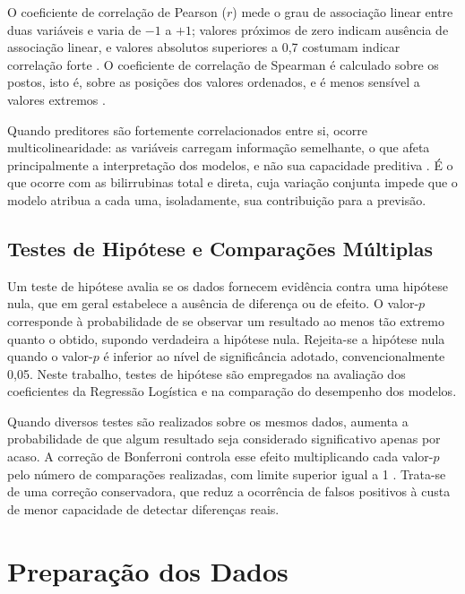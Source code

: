 O coeficiente de correlação de Pearson ($r$) mede o grau de associação linear entre duas variáveis e varia de $-1$ a $+1$; valores próximos de zero indicam ausência de associação linear, e valores absolutos superiores a 0,7 costumam indicar correlação forte \cite{Dormann2013Collinearity}. O coeficiente de correlação de Spearman é calculado sobre os postos, isto é, sobre as posições dos valores ordenados, e é menos sensível a valores extremos \cite{Schober2018Correlation}.

Quando preditores são fortemente correlacionados entre si, ocorre multicolinearidade: as variáveis carregam informação semelhante, o que afeta principalmente a interpretação dos modelos, e não sua capacidade preditiva \cite{Strobl2008Conditional, Dormann2013Collinearity}. É o que ocorre com as bilirrubinas total e direta, cuja variação conjunta impede que o modelo atribua a cada uma, isoladamente, sua contribuição para a previsão.

\subsection{Testes de Hipótese e Comparações Múltiplas}
\label{sec:fund_bonferroni}

Um teste de hipótese avalia se os dados fornecem evidência contra uma hipótese nula, que em geral estabelece a ausência de diferença ou de efeito. O valor-$p$ corresponde à probabilidade de se observar um resultado ao menos tão extremo quanto o obtido, supondo verdadeira a hipótese nula. Rejeita-se a hipótese nula quando o valor-$p$ é inferior ao nível de significância adotado, convencionalmente 0,05. Neste trabalho, testes de hipótese são empregados na avaliação dos coeficientes da Regressão Logística e na comparação do desempenho dos modelos.

Quando diversos testes são realizados sobre os mesmos dados, aumenta a probabilidade de que algum resultado seja considerado significativo apenas por acaso. A correção de Bonferroni controla esse efeito multiplicando cada valor-$p$ pelo número de comparações realizadas, com limite superior igual a 1 \cite{Demsar2006Statistical}. Trata-se de uma correção conservadora, que reduz a ocorrência de falsos positivos à custa de menor capacidade de detectar diferenças reais.

\section{Preparação dos Dados}
\label{sec:fund_preparacao}

